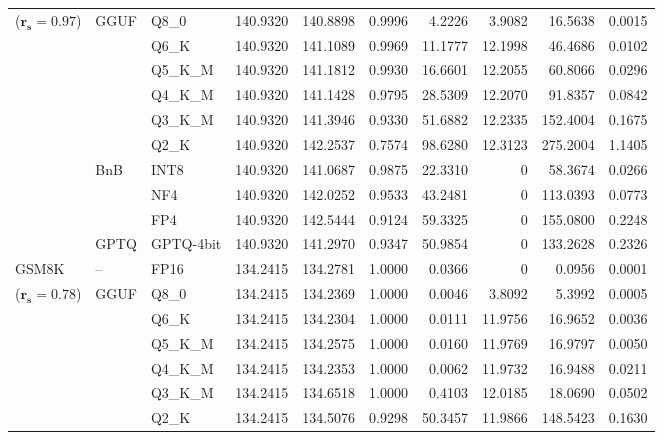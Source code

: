 \begin{table}[t]
{\begin{tabular}{ll l rrrrrrr}
{\small ($\mathbf{r_s{=}0.97}$)} & GGUF & Q8\_0 & 140.9320 & 140.8898 & 0.9996 & 4.2226 & 3.9082 & 16.5638 & 0.0015 \\
 &  & Q6\_K & 140.9320 & 141.1089 & 0.9969 & 11.1777 & 12.1998 & 46.4686 & 0.0102 \\
 &  & Q5\_K\_M & 140.9320 & 141.1812 & 0.9930 & 16.6601 & 12.2055 & 60.8066 & 0.0296 \\
 &  & Q4\_K\_M & 140.9320 & 141.1428 & 0.9795 & 28.5309 & 12.2070 & 91.8357 & 0.0842 \\
 &  & Q3\_K\_M & 140.9320 & 141.3946 & \cellcolor{red!18} 0.9330 & \cellcolor{red!18} 51.6882 & 12.2335 & \cellcolor{red!18} 152.4004 & \cellcolor{red!18} 0.1675 \\
 &  & Q2\_K & 140.9320 & 142.2537 & \cellcolor{red!35} 0.7574 & \cellcolor{red!35} 98.6280 & 12.3123 & \cellcolor{red!35} 275.2004 & \cellcolor{red!35} 1.1405 \\
 & BnB & INT8 & 140.9320 & 141.0687 & 0.9875 & 22.3310 & \cellcolor{cyan!12} $0$ & 58.3674 & 0.0266 \\
 &  & NF4 & 140.9320 & 142.0252 & 0.9533 & 43.2481 & \cellcolor{cyan!12} $0$ & 113.0393 & 0.0773 \\
 &  & FP4 & 140.9320 & 142.5444 & \cellcolor{red!18} 0.9124 & \cellcolor{red!18} 59.3325 & \cellcolor{cyan!12} $0$ & \cellcolor{red!18} 155.0800 & \cellcolor{red!18} 0.2248 \\
 & GPTQ & GPTQ-4bit & 140.9320 & 141.2970 & \cellcolor{red!18} 0.9347 & \cellcolor{red!18} 50.9854 & \cellcolor{cyan!12} $0$ & \cellcolor{red!18} 133.2628 & \cellcolor{red!18} 0.2326 \\
\midrule
GSM8K & -- & FP16 & 134.2415 & 134.2781 & 1.0000 & 0.0366 & \cellcolor{cyan!12} $0$ & 0.0956 & 0.0001 \\
{\small ($\mathbf{r_s{=}0.78}$)} & GGUF & Q8\_0 & 134.2415 & 134.2369 & 1.0000 & 0.0046 & 3.8092 & 5.3992 & 0.0005 \\
 &  & Q6\_K & 134.2415 & 134.2304 & 1.0000 & 0.0111 & 11.9756 & 16.9652 & 0.0036 \\
 &  & Q5\_K\_M & 134.2415 & 134.2575 & 1.0000 & 0.0160 & 11.9769 & 16.9797 & 0.0050 \\
 &  & Q4\_K\_M & 134.2415 & 134.2353 & 1.0000 & 0.0062 & 11.9732 & 16.9488 & 0.0211 \\
 &  & Q3\_K\_M & 134.2415 & 134.6518 & 1.0000 & 0.4103 & 12.0185 & 18.0690 & 0.0502 \\
 &  & Q2\_K & 134.2415 & 134.5076 & \cellcolor{red!18} 0.9298 & \cellcolor{red!18} 50.3457 & 11.9866 & \cellcolor{red!18} 148.5423 & \cellcolor{red!18} 0.1630 \\

\end{tabular}}
\end{table}
